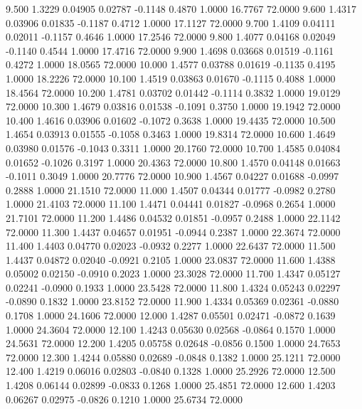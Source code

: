    9.500   1.3229   0.04905   0.02787  -0.1148   0.4870   1.0000  16.7767  72.0000
   9.600   1.4317   0.03906   0.01835  -0.1187   0.4712   1.0000  17.1127  72.0000
   9.700   1.4109   0.04111   0.02011  -0.1157   0.4646   1.0000  17.2546  72.0000
   9.800   1.4077   0.04168   0.02049  -0.1140   0.4544   1.0000  17.4716  72.0000
   9.900   1.4698   0.03668   0.01519  -0.1161   0.4272   1.0000  18.0565  72.0000
  10.000   1.4577   0.03788   0.01619  -0.1135   0.4195   1.0000  18.2226  72.0000
  10.100   1.4519   0.03863   0.01670  -0.1115   0.4088   1.0000  18.4564  72.0000
  10.200   1.4781   0.03702   0.01442  -0.1114   0.3832   1.0000  19.0129  72.0000
  10.300   1.4679   0.03816   0.01538  -0.1091   0.3750   1.0000  19.1942  72.0000
  10.400   1.4616   0.03906   0.01602  -0.1072   0.3638   1.0000  19.4435  72.0000
  10.500   1.4654   0.03913   0.01555  -0.1058   0.3463   1.0000  19.8314  72.0000
  10.600   1.4649   0.03980   0.01576  -0.1043   0.3311   1.0000  20.1760  72.0000
  10.700   1.4585   0.04084   0.01652  -0.1026   0.3197   1.0000  20.4363  72.0000
  10.800   1.4570   0.04148   0.01663  -0.1011   0.3049   1.0000  20.7776  72.0000
  10.900   1.4567   0.04227   0.01688  -0.0997   0.2888   1.0000  21.1510  72.0000
  11.000   1.4507   0.04344   0.01777  -0.0982   0.2780   1.0000  21.4103  72.0000
  11.100   1.4471   0.04441   0.01827  -0.0968   0.2654   1.0000  21.7101  72.0000
  11.200   1.4486   0.04532   0.01851  -0.0957   0.2488   1.0000  22.1142  72.0000
  11.300   1.4437   0.04657   0.01951  -0.0944   0.2387   1.0000  22.3674  72.0000
  11.400   1.4403   0.04770   0.02023  -0.0932   0.2277   1.0000  22.6437  72.0000
  11.500   1.4437   0.04872   0.02040  -0.0921   0.2105   1.0000  23.0837  72.0000
  11.600   1.4388   0.05002   0.02150  -0.0910   0.2023   1.0000  23.3028  72.0000
  11.700   1.4347   0.05127   0.02241  -0.0900   0.1933   1.0000  23.5428  72.0000
  11.800   1.4324   0.05243   0.02297  -0.0890   0.1832   1.0000  23.8152  72.0000
  11.900   1.4334   0.05369   0.02361  -0.0880   0.1708   1.0000  24.1606  72.0000
  12.000   1.4287   0.05501   0.02471  -0.0872   0.1639   1.0000  24.3604  72.0000
  12.100   1.4243   0.05630   0.02568  -0.0864   0.1570   1.0000  24.5631  72.0000
  12.200   1.4205   0.05758   0.02648  -0.0856   0.1500   1.0000  24.7653  72.0000
  12.300   1.4244   0.05880   0.02689  -0.0848   0.1382   1.0000  25.1211  72.0000
  12.400   1.4219   0.06016   0.02803  -0.0840   0.1328   1.0000  25.2926  72.0000
  12.500   1.4208   0.06144   0.02899  -0.0833   0.1268   1.0000  25.4851  72.0000
  12.600   1.4203   0.06267   0.02975  -0.0826   0.1210   1.0000  25.6734  72.0000
